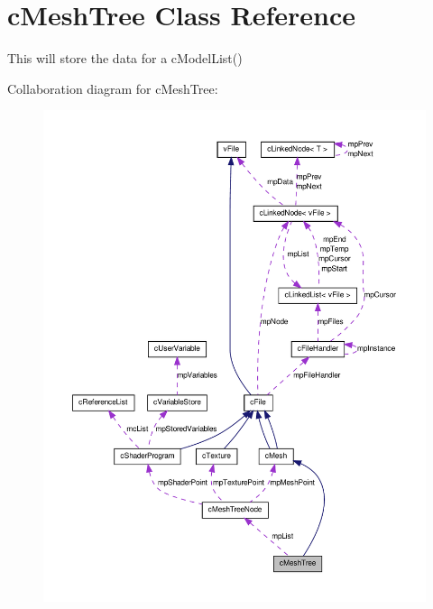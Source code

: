 \hypertarget{classc_mesh_tree}{
\section{cMeshTree Class Reference}
\label{classc_mesh_tree}
}


This will store the data for a cModelList()  




Collaboration diagram for cMeshTree:\nopagebreak
\begin{figure}[H]
\begin{center}
\leavevmode
\includegraphics[width=400pt]{classc_mesh_tree__coll__graph}
\end{center}
\end{figure}
